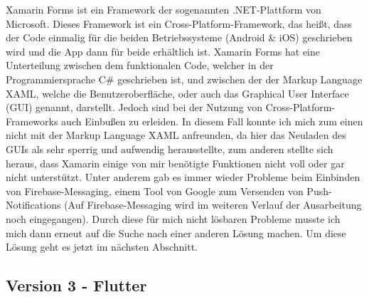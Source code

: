     Xamarin Forms ist ein Framework der sogenannten \glqq .NET-Plattform\grqq{} von Microsoft. Dieses 
    Framework ist ein Cross-Platform-Framework, das heißt, dass der Code einmalig für 
    die beiden Betriebssysteme (Android \& iOS) geschrieben wird und die App dann für 
    beide erhältlich ist. Xamarin Forms hat eine Unterteilung zwischen dem funktionalen 
    Code, welcher in der Programmiersprache C\# geschrieben ist, und zwischen der der Markup Language XAML, 
    welche die Benutzeroberfläche, oder auch das Graphical User Interface (GUI) genannt, darstellt\cite[vgl.]{Xamarin}. 
    Jedoch sind bei der Nutzung von Cross-Platform-Frameworks auch Einbußen zu erleiden. In diesem Fall konnte ich mich zum 
    einen nicht mit der Markup Language XAML anfreunden, da hier das Neuladen des GUIs 
    als sehr sperrig und aufwendig herausstellte, zum anderen stellte sich heraus, dass 
    Xamarin einige von mir benötigte Funktionen nicht voll oder gar nicht unterstützt. 
    Unter anderem gab es immer wieder Probleme beim Einbinden von Firebase-Messaging, einem
    Tool von Google zum Versenden von Push-Notifications (Auf Firebase-Messaging wird im
    weiteren Verlauf der Ausarbeitung noch eingegangen).
    Durch diese für mich nicht lösbaren Probleme musste ich mich dann erneut auf die Suche
    nach einer anderen Lösung machen. Um diese Lösung geht es jetzt im nächsten Abschnitt.

\subsection{Version 3 - Flutter}

